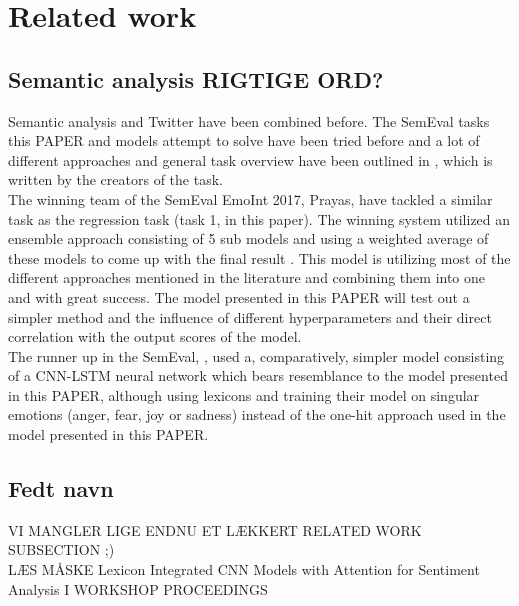 
\section{Related work}

\subsection{Semantic analysis RIGTIGE ORD?}

Semantic analysis and Twitter have been combined before. The SemEval tasks this PAPER and models attempt to solve have been tried before and a lot of different approaches and general task overview have been outlined in \cite{wassa2017}, which is written by the creators of the task.\\
The winning team of the SemEval EmoInt 2017, Prayas, have tackled a similar task as the regression task (task 1, in this paper). The winning system utilized an ensemble approach consisting of 5 sub models and using a weighted average of these models to come up with the final result \cite{prayas}. This model is utilizing most of the different approaches mentioned in the literature and combining them into one and with great success. The model presented in this PAPER will test out a simpler method and the influence of different hyperparameters and their direct correlation with the output scores of the model.\\
The runner up in the SemEval, \cite{ims}, used a, comparatively, simpler model consisting of a CNN-LSTM neural network which bears resemblance to the model presented in this PAPER, although using lexicons and training their model on singular emotions (anger, fear, joy or sadness) instead of the one-hit approach used in the model presented in this PAPER.\\

\subsection{Fedt navn}

VI MANGLER LIGE ENDNU ET LÆKKERT RELATED WORK SUBSECTION ;)\\
LÆS MÅSKE Lexicon Integrated CNN Models with Attention for Sentiment Analysis I WORKSHOP PROCEEDINGS